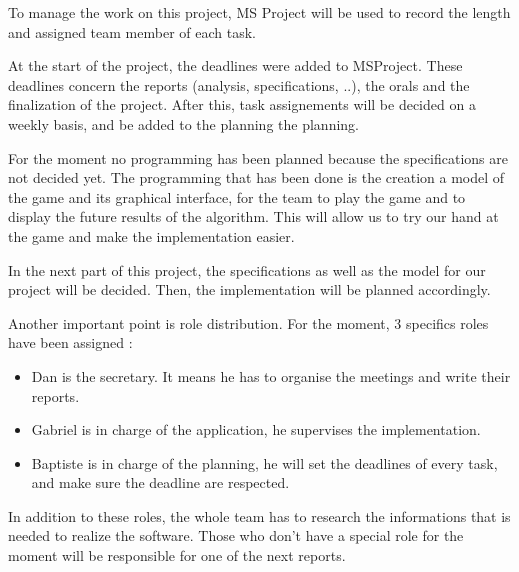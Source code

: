 To manage the work on this project, MS Project will be used to record the length and assigned team member of each task.
\newline

At the start of the project, the deadlines were added to MSProject. These deadlines concern the reports (analysis, specifications, ..), the orals and the finalization of the project. After this, task assignements will be decided on a weekly basis, and be added to the planning the planning.
\newline

For the moment no programming has been planned because the specifications are not decided yet. The programming that has been done is the creation a model of the game and its graphical interface, for the team to play the game and to display the future results of the algorithm. This will allow us to try our hand at the game and make the implementation easier.
\newline

In the next part of this project, the specifications as well as the model for our project will be decided. Then, the implementation will be planned accordingly.
\newline


Another important point is role distribution. For the moment, 3 specifics roles have been assigned : 
\begin{itemize}
\item  Dan is the secretary. It means he has to organise the meetings and write their reports.
\item Gabriel is in charge of the application, he supervises the implementation.
\item Baptiste is in charge of the planning, he will set the deadlines of every task, and make sure the deadline are respected.
\end{itemize}
In addition to these roles, the whole team has to research the informations that is needed to realize the software. Those who don't have a special role for the moment will be responsible for one of the next reports.
